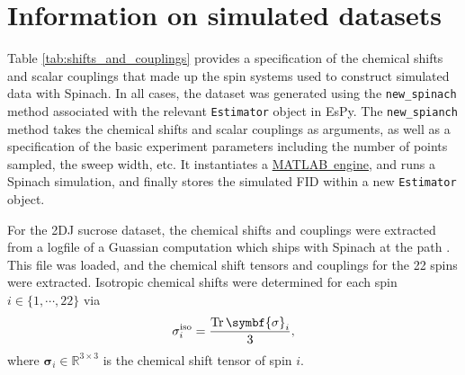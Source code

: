 \section{Information on simulated datasets}
\label{sec:simulated-datasets}

Table \ref{tab:shifts_and_couplings} provides a specification of the chemical
shifts and scalar couplings that made up the spin systems used to construct
simulated data with Spinach. In all cases, the dataset was generated using the
\texttt{new\_spinach} method associated with the relevant
\texttt{Estimator} object in \ac{EsPy}. The \texttt{new\_spianch} method takes the
chemical shifts and scalar couplings as arguments, as well as a specification
of the basic experiment parameters including the number of points sampled, the
sweep width, etc. It instantiates a
\href{https://www.mathworks.com/help/matlab/matlab-engine-for-python.html}{MATLAB\textregistered\
engine}, and runs a Spinach simulation, and finally stores the simulated
\ac{FID} within a new \texttt{Estimator} object.

For the \ac{2DJ} sucrose dataset, the chemical shifts and couplings were
extracted from a logfile of a Guassian computation which ships with Spinach at
the path
.
This file was loaded, and the chemical shift tensors and couplings for the 22 spins
were extracted. Isotropic chemical shifts were determined for each spin $i
\in \lbrace 1, \cdots, 22\rbrace$ via
\begin{equation}
    \sigma^{\text{iso}}_i = \frac{\Tr \symbf{\sigma}_i}{3},
\end{equation}
where $\symbf{\sigma}_i \in \mathbb{R}^{3 \times 3}$ is the chemical shift
tensor of spin $i$.


